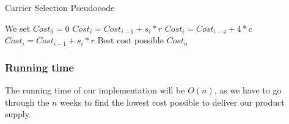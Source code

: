 \documentclass{article}
\begin{document}
\begin{algorithm}[H]
\caption{Carrier Selection Pseudocode}
\begin{algorithmic}[1]
\State We set $Cost_0 = 0$
  \State $Cost_i = Cost_{i-1}+s_i*r$
 \Else
   \State $Cost_i = Cost_{i-4}+4*c$
  \Else
   \State $Cost_i = Cost_{i-1}+s_i*r$
  \EndIf
 \EndIf
\EndFor
\State \Return Best cost possible $Cost_n$
\end{algorithmic}
\end{algorithm}

\subsubsection*{Running time}

The running time of our implementation will be $O(n)$, as we have to go through the $n$ weeks to find the lowest cost possible to deliver our product supply.
\end{document}
